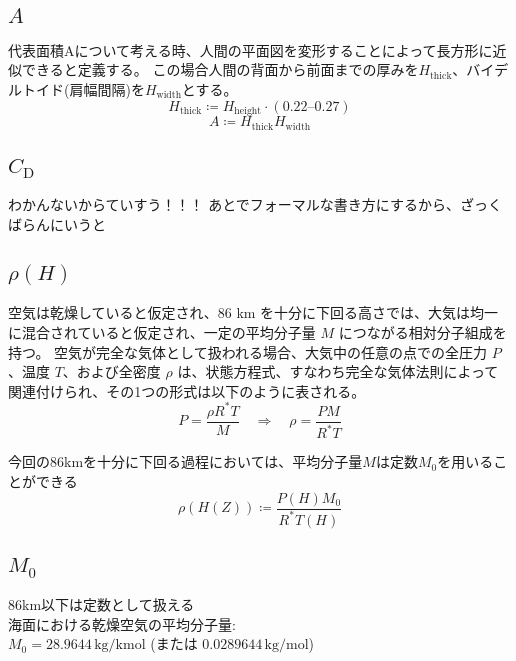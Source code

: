\documentclass[a4paper,12pt]{article}
\begin{document}
\subsection{\texorpdfstring{$A$}{A}}
代表面積Aについて考える時、人間の平面図を変形することによって長方形に近似できると定義する。
この場合人間の背面から前面までの厚みを$H_{\mathrm{thick}}$、バイデルトイド(肩幅間隔)を$H_{\mathrm{width}}$とする。
\[
H_{\mathrm{thick}} \coloneq H_{\mathrm{height}} \cdot (0.22 \text{--} 0.27)
\]
\[
A \coloneq H_{\mathrm{thick}} H_{\mathrm{width}}
\]

\subsection{\texorpdfstring{$C_{\mathrm{D}}$}{Cd}}
わかんないからていすう！！！ %
あとでフォーマルな書き方にするから、ざっくばらんにいうと




\subsection{\texorpdfstring{$\rho(H)$}{rho(H)}}
空気は乾燥していると仮定され、86 km を十分に下回る高さでは、大気は均一に混合されていると仮定され、一定の平均分子量 $M$ につながる相対分子組成を持つ。
空気が完全な気体として扱われる場合、大気中の任意の点での全圧力 $P$、温度 $T$、および全密度 $\rho$ は、状態方程式、すなわち完全な気体法則によって関連付けられ、その1つの形式は以下のように表される。
\[
P = \frac{\rho R^* T}{M} \quad \Rightarrow \quad \rho = \frac{P M}{R^* T}
\]

今回の86kmを十分に下回る過程においては、平均分子量$M$は定数$M_0$を用いることができる
\[
  \rho(H(Z)) \coloneq \frac{P(H) M_0}{R^* T(H)}
\]

\subsection{\texorpdfstring{$M_0$}{M0}}
86km以下は定数として扱える\\
海面における乾燥空気の平均分子量:\\ $M_0 = 28.9644 \, \mathrm{kg/kmol}$ (または $0.0289644 \, \mathrm{kg/mol}$)\\\\
\end{document}
